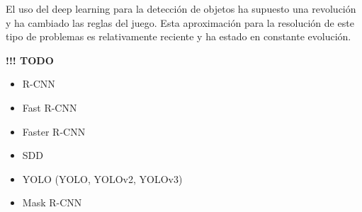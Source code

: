 El uso del deep learning para la detección de objetos ha supuesto una revolución y ha cambiado las reglas del juego. Esta aproximación para la resolución de este tipo de problemas es relativamente reciente y ha estado en constante evolución.

{\color{red} \textbf{!!! TODO}}

\begin{itemize}
	\item R-CNN
	\item Fast R-CNN
	\item Faster R-CNN
	\item SDD
	\item YOLO (YOLO, YOLOv2, YOLOv3)
	\item Mask R-CNN
\end{itemize}